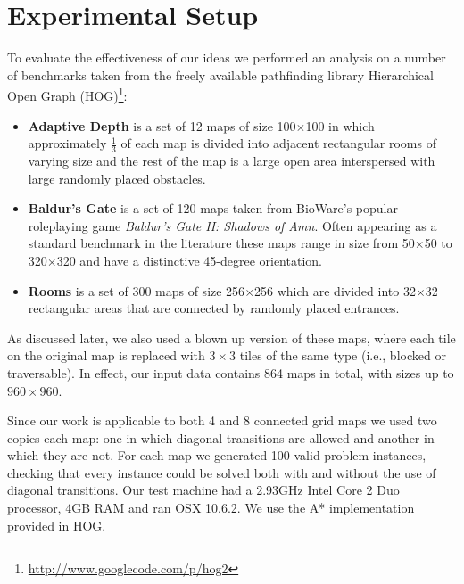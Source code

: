 \section{Experimental Setup}
To evaluate the effectiveness of our ideas we performed
an analysis on a number of benchmarks taken from
the freely available pathfinding library 
Hierarchical Open Graph (HOG)\footnote{\url{http://www.googlecode.com/p/hog2}}:
\begin{itemize}
\item{\textbf{Adaptive Depth} is a set of 12 maps of size 100$\times$100 in which approximately
$\frac{1}{3}$ of each map is divided into adjacent rectangular rooms of
varying size and the rest of the map is a large open area interspersed with 
large randomly placed obstacles.}
\item{\textbf{Baldur's Gate} is a set of 120 maps taken from BioWare's popular
roleplaying game \emph{Baldur's Gate II: Shadows of Amn}. 
Often appearing as a standard benchmark in the literature 
\cite{botea04,bjornsson05,bjornsson06,sturtevant07} these maps range in 
size from 50$\times$50 to 320$\times$320 and have a distinctive 45-degree orientation.}
\item{\textbf{Rooms} is a set of 300 maps of size 256$\times$256 which are divided into 32$\times$32
rectangular areas that are connected by randomly placed entrances.}
\end{itemize}

As discussed later, we also used a blown up version of these maps,
where each tile on the original map is replaced with $3\times3$ tiles of the same type
(i.e., blocked or traversable). In effect, our input data contains 864 maps in total,
with sizes up to $960\times960$.

Since our work is applicable to both 4 and 8 connected grid maps we used two
copies each map: one in which diagonal transitions are allowed and another
in which they are not.
For each map we generated 100 valid problem instances, checking that every
instance could be solved both with and without the use of diagonal
transitions.
%
Our test machine had a 2.93GHz Intel Core 2 Duo processor, 4GB RAM and
ran OSX 10.6.2.
We use the A* implementation provided in HOG.
